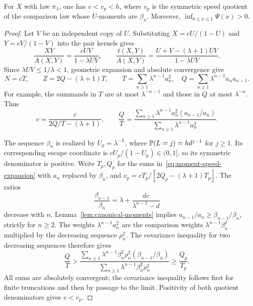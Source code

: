 \begin{lemma}\label{lem:harmonic-speed}
For $X$ with law $\pi_\lambda$, one has $v<v_p<h$, where $v_p$ is the symmetric speed quotient of the comparison law whose $U$-moments are $\beta_n$. Moreover, $\inf_{0\le x\le1}\Psi(x)>0$.
\end{lemma}
\begin{proof}
Let $V$ be an independent copy of $U$. Substituting $X=cU/(1-U)$ and $Y=cV/(1-V)$ into the pair kernels gives
\[
 \frac{XY}{A(X,Y)}=\frac{cUV}{1-\lambda UV},\qquad
 \frac{t(X,Y)}{A(X,Y)}=
 \frac{U+V-(\lambda+1)UV}{1-\lambda UV}.
\]
Since $\lambda UV\le1/\lambda<1$, geometric expansion and absolute convergence give
\begin{equation}\label{eq:moment-speed-expansion}
 N=cT,\qquad Z=2Q-(\lambda+1)T,\qquad
 T=\sum_{n\ge1}\lambda^{n-1}a_n^2,\quad
 Q=\sum_{n\ge1}\lambda^{n-1}a_na_{n-1}.
\end{equation}
For example, the summands in $T$ are at most $\lambda^{-n-1}$ and those in $Q$ at most $\lambda^{-n}$. Thus
\[
 v=\frac{c}{2Q/T-(\lambda+1)},\qquad
 \frac QT=
 \frac{\sum_{n\ge1}\lambda^{n-1}a_n^2(a_{n-1}/a_n)}
 {\sum_{n\ge1}\lambda^{n-1}a_n^2}.
\]

The sequence $\beta_n$ is realized by $U_p=\lambda^{-L}$, where
$\mathbb P(L=j)=h d^{j-1}$ for $j\ge1$. Its corresponding escape coordinate is $cU_p/(1-U_p)\in(0,1]$, so its symmetric denominator is positive. Write $T_p,Q_p$ for the sums in~\eqref{eq:moment-speed-expansion} with $a_n$ replaced by $\beta_n$, and $v_p=cT_p/[2Q_p-(\lambda+1)T_p]$. The ratios
\[
 \frac{\beta_{n-1}}{\beta_n}
 =\lambda+\frac{dc}{\lambda^{n-1}-d}
\]
decrease with $n$. Lemma~\ref{lem:canonical-moments} implies $a_{n-1}/a_n\ge\beta_{n-1}/\beta_n$, strictly for $n\ge2$. The weights $\lambda^{n-1}a_n^2$ are the comparison weights $\lambda^{n-1}\beta_n^2$ multiplied by the decreasing sequence $\rho_n^2$. The covariance inequality for two decreasing sequences therefore gives
\[
 \frac QT>
 \frac{\sum_{n\ge1}\lambda^{n-1}\beta_n^2\rho_n^2
       (\beta_{n-1}/\beta_n)}
 {\sum_{n\ge1}\lambda^{n-1}\beta_n^2\rho_n^2}
 \ge\frac{Q_p}{T_p}.
\]
All sums are absolutely convergent; the covariance inequality follows first for finite truncations and then by passage to the limit. Positivity of both quotient denominators gives $v<v_p$.


\end{proof}
